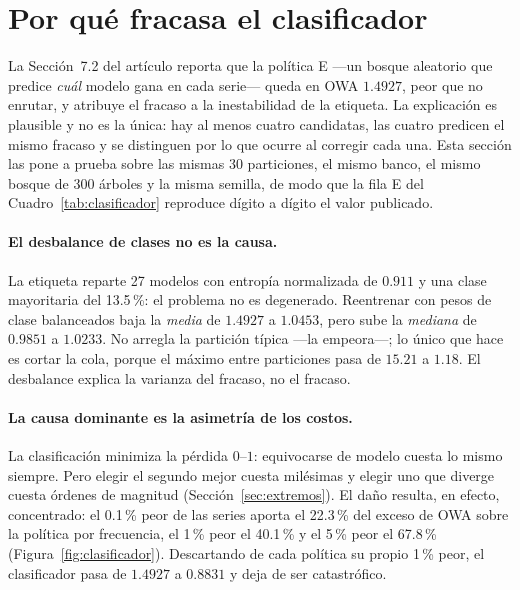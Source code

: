 \section{Por qué fracasa el clasificador}\label{sec:clasificador}

La Sección~7.2 del artículo reporta que la política E ---un bosque aleatorio que
predice \emph{cuál} modelo gana en cada serie--- queda en OWA $1.4927$, peor que no
enrutar, y atribuye el fracaso a la inestabilidad de la etiqueta. La explicación es
plausible y no es la única: hay al menos cuatro candidatas, las cuatro predicen el mismo
fracaso y se distinguen por lo que ocurre al corregir cada una. Esta sección las pone a
prueba sobre las mismas 30 particiones, el mismo banco, el mismo bosque de 300 árboles y
la misma semilla, de modo que la fila E del Cuadro~\ref{tab:clasificador} reproduce
dígito a dígito el valor publicado.

\paragraph{El desbalance de clases no es la causa.} La etiqueta reparte 27 modelos con
entropía normalizada de $0.911$ y una clase mayoritaria del 13.5\,\%: el problema no es
degenerado. Reentrenar con pesos de clase balanceados baja la \emph{media} de $1.4927$ a
$1.0453$, pero sube la \emph{mediana} de $0.9851$ a $1.0233$. No arregla la partición
típica ---la empeora---; lo único que hace es cortar la cola, porque el máximo entre
particiones pasa de $15.21$ a $1.18$. El desbalance explica la varianza del fracaso, no
el fracaso.

\paragraph{La causa dominante es la asimetría de los costos.} La clasificación minimiza
la pérdida $0$--$1$: equivocarse de modelo cuesta lo mismo siempre. Pero elegir el
segundo mejor cuesta milésimas y elegir uno que diverge cuesta órdenes de magnitud
(Sección~\ref{sec:extremos}). El daño resulta, en efecto, concentrado: el 0.1\,\% peor
de las series aporta el 22.3\,\% del exceso de OWA sobre la política por frecuencia, el
1\,\% peor el 40.1\,\% y el 5\,\% peor el 67.8\,\%
(Figura~\ref{fig:clasificador}). Descartando de cada política su propio 1\,\% peor, el
clasificador pasa de $1.4927$ a $0.8831$ y deja de ser catastrófico.

